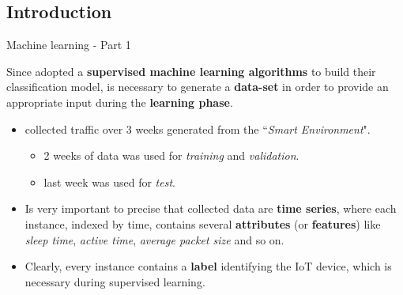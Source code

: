 \documentclass[10pt]{beamer}
\begin{document}
\subsection{Introduction}
\begin{frame}{Machine learning - Part 1}

\begin{block}{}
\justifying
Since \citet{ITPAReport} adopted a \textbf{supervised machine learning algorithms} to build their classification model, is necessary to generate a \textbf{data-set} in order to provide an appropriate input during the \textbf{learning phase}.
\end{block}

\begin{itemize}
\justifying
\item \citet{ITPAReport} collected traffic over $3$ weeks generated from the ``\textit{Smart Environment}".
\begin{itemize}
\item 2 weeks of data was used for \textit{training} and \textit{validation}.
\item last week was used for \textit{test}.
\end{itemize}

\item Is very important to precise that collected data are \textbf{time series}, where each instance, indexed by time, contains several \textbf{attributes} (or \textbf{features}) like \textit{sleep time}, \textit{active time}, \textit{average packet size} and so on.

\item Clearly, every instance contains a \textbf{label} identifying the IoT device, which is necessary during supervised learning.
\end{itemize}

\end{frame} 
\end{document}
